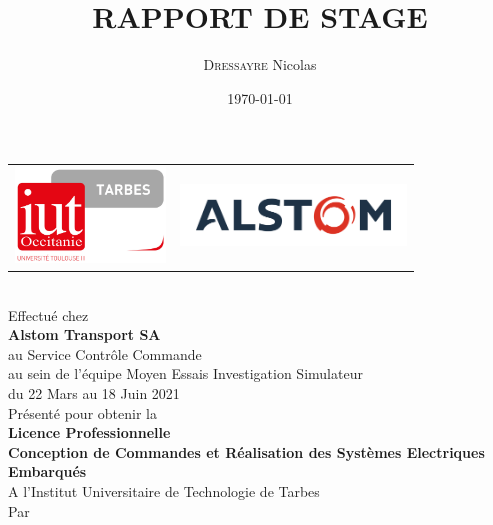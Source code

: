 \documentclass[a4paper]{report}
\title{\LARGE{RAPPORT DE STAGE}}
\author{\textsc{Dressayre} Nicolas}
\date{\today}
\begin{document}
	
	
		\enlargethispage{2cm}
		
		\begin{center}
			\begin{tabular}{lr}
				\includegraphics[width=4cm]{logo_iut.jpg} & \includegraphics[width=6cm]{logo_alstom.png} \\
			\end{tabular}
			
			\vspace*{3cm}
			\Huge{\@title}\\
			
			\vspace*{1cm}
			\large{Effectué chez}\\
			\vspace*{0.5cm}
			\large{\textbf{Alstom Transport SA}}\\
			au Service Contrôle Commande\\
			au sein de l'équipe Moyen Essais Investigation Simulateur\\
			du 22 Mars au 18 Juin 2021 \\
			
			\vspace*{1cm}
			\large{Présenté pour obtenir la}\\
			\vspace*{0.5cm}
			\large{\textbf{Licence Professionnelle}}\\
			\large{\textbf{Conception de Commandes et Réalisation des Systèmes Electriques Embarqués}}\\
			\vspace*{0.5cm}
			\large{A l'Institut Universitaire de Technologie de Tarbes}\\
			
			\vspace*{1cm}
			\large{Par}\\
			\vspace*{0.5cm}
			\large{\@author} 
			

\end{center}
\end{document}
